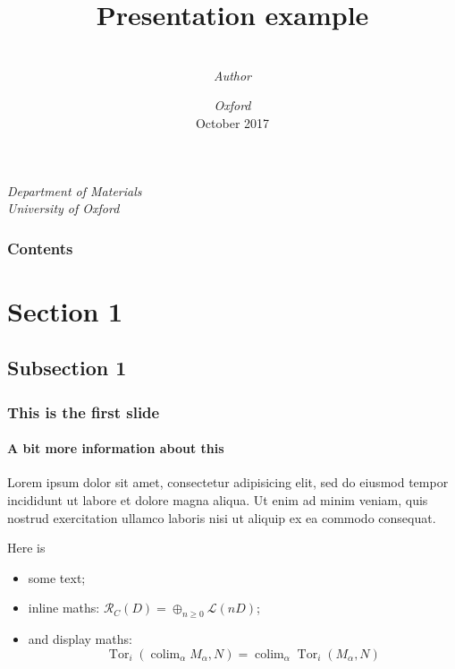 


\title[Presentation]
	{%
		Presentation example
	} %
\author%
	{%
		\\
		\textit{Author}
	}
\institute%
	{%
		\textit{Department of Materials}\\
		\textit{University of Oxford}
	}
\date[DCG]%
	{%
		\textit{Oxford}\\
		October 2017
	}


	\begin{frame}[plain]
		\titlepage
	\end{frame}
	\begin{frame}
		\frametitle{Contents}
		\framesubtitle{\inserttitle}
		\tableofcontents
	\end{frame}
	\section{Section 1}
	\subsection{Subsection 1}
	\begin{frame}
		\frametitle{This is the first slide}
		\framesubtitle{A bit more information about this}
		
		Lorem ipsum dolor sit amet, consectetur adipisicing elit, sed do eiusmod
		tempor incididunt ut labore et dolore magna aliqua. Ut enim ad minim veniam,
		quis nostrud exercitation ullamco laboris nisi ut aliquip ex ea commodo
		consequat.
		
		Here is
		\the\paperwidth
		\begin{itemize}
			\item some text;
			\item inline maths: $\mathcal{R}_C(D)=\oplus_{n\geqslant0}\mathcal{L}(nD)$;
			\item and display maths:
			\[
			\operatorname{Tor}_i(\operatorname{colim}_\alpha M_\alpha, N)
			= \operatorname{colim}_\alpha\operatorname{Tor}_i(M_\alpha,N)
			\]
		\end{itemize}
		
	\end{frame}
	
